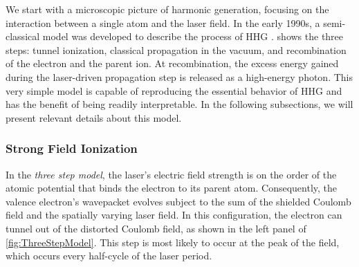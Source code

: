 We start with a microscopic picture of harmonic generation, focusing on the interaction between a single atom and the laser field. In the early 1990s, a semi-classical model was developed to describe the process of HHG \cite{schaferThresholdIonizationHigh1993,corkumPlasmaPerspectiveStrong1993}.  shows the three steps: tunnel ionization, classical propagation in the vacuum, and recombination of the electron and the parent ion. At recombination, the excess energy gained during the laser-driven propagation step is released as a high-energy photon. This very simple model is capable of reproducing the essential behavior of HHG and has the benefit of being readily interpretable. In the following subsections, we will present relevant details about this model.

\subsubsection{Strong Field Ionization}

In the \textit{three step model}, the laser's electric field strength is on the order of the atomic potential that binds the electron to its parent atom. Consequently, the valence electron's wavepacket evolves subject to the sum of the shielded Coulomb field and the spatially varying laser field. In this configuration, the electron can tunnel out of the distorted Coulomb field, as shown in the left panel of \cref{fig:ThreeStepModel}. This step is most likely to occur at the peak of the field, which occurs every half-cycle of the laser period.


